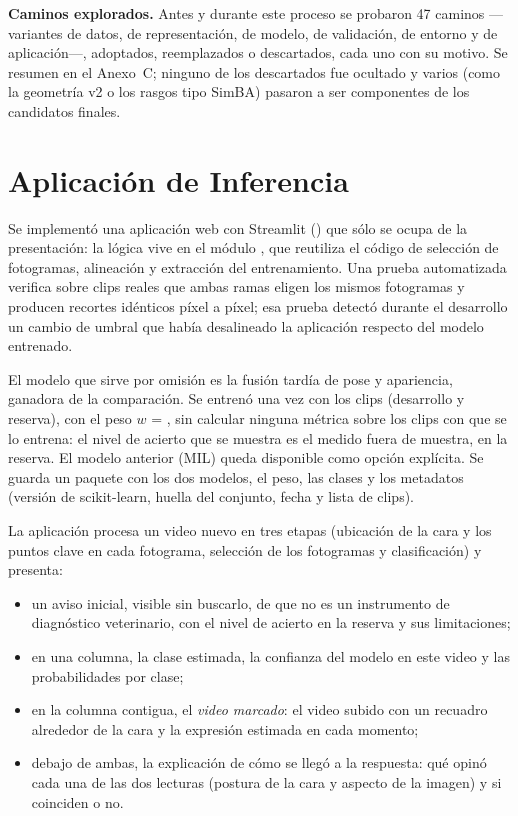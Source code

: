\textbf{Caminos explorados.} Antes y durante este proceso se probaron 47 caminos ---variantes de datos, de representación, de modelo, de validación, de entorno y de aplicación---, adoptados, reemplazados o descartados, cada uno con su motivo. Se resumen en el Anexo~C; ninguno de los descartados fue ocultado y varios (como la geometría v2 o los rasgos tipo SimBA) pasaron a ser componentes de los candidatos finales.

\section{Aplicación de Inferencia}
Se implementó una aplicación web con Streamlit () que sólo se ocupa de la presentación: la lógica vive en el módulo , que reutiliza el código de selección de fotogramas, alineación y extracción del entrenamiento. Una prueba automatizada verifica sobre clips reales que ambas ramas eligen los mismos fotogramas y producen recortes idénticos píxel a píxel; esa prueba detectó durante el desarrollo un cambio de umbral que había desalineado la aplicación respecto del modelo entrenado.

El modelo que sirve por omisión es la fusión tardía de pose y apariencia, ganadora de la comparación. Se entrenó una vez con los \ClipsTotal{} clips (desarrollo y reserva), con el peso $w$ = \PesoPose{}, sin calcular ninguna métrica sobre los clips con que se lo entrena: el nivel de acierto que se muestra es el medido fuera de muestra, en la reserva. El modelo anterior (MIL) queda disponible como opción explícita. Se guarda un paquete con los dos modelos, el peso, las clases y los metadatos (versión de scikit-learn, huella del conjunto, fecha y lista de clips).

La aplicación procesa un video nuevo en tres etapas (ubicación de la cara y los puntos clave en cada fotograma, selección de los \Fotogramas{} fotogramas y clasificación) y presenta:
\begin{itemize}
  \item un aviso inicial, visible sin buscarlo, de que no es un instrumento de diagnóstico veterinario, con el nivel de acierto en la reserva y sus limitaciones;
  \item en una columna, la clase estimada, la confianza del modelo en este video y las probabilidades por clase;
  \item en la columna contigua, el \textit{video marcado}: el video subido con un recuadro alrededor de la cara y la expresión estimada en cada momento;
  \item debajo de ambas, la explicación de cómo se llegó a la respuesta: qué opinó cada una de las dos lecturas (postura de la cara y aspecto de la imagen) y si coinciden o no.
\end{itemize}

